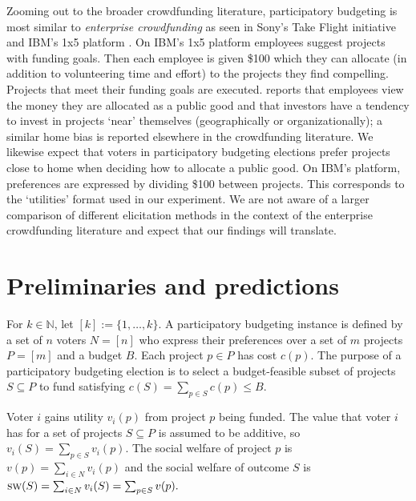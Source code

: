 \documentclass[mnsc,blindrev]{informs3_freeuse} %
\newcommand{\kibitz}[2]{\ifnum\Comments=1{\color{#1}{#2}}\fi}
\newcommand{\gb}[1]{\kibitz{red}{[GB:#1]}}
\newcommand{\sw}{\textsc{sw}}
\newcommand{\voters}{{N}}
\begin{document}
Zooming out to the   broader crowdfunding literature, participatory budgeting is most similar to \emph{enterprise crowdfunding} as seen in Sony's Take Flight initiative and IBM's 1x5 platform \citep{muller2013crowdfunding,muller2014geographical}.
On IBM's 1x5 platform employees suggest projects with funding goals. Then each  employee is given \$100 which they can allocate (in addition to volunteering time and effort) to the projects they find compelling. %
Projects that meet their funding goals are executed. \citet{muller2014geographical} reports that employees view the money they are allocated as a public good and that investors have a tendency to invest in projects `near' themselves (geographically or organizationally); a similar home bias is reported elsewhere in the crowdfunding literature. We likewise expect that voters in participatory budgeting elections prefer projects close to home when deciding how to allocate a public good. On IBM's platform, preferences are expressed by dividing \$100 between projects. This corresponds to the `utilities' format used in our experiment. We are not aware of a larger comparison of different elicitation methods in the context of the enterprise crowdfunding literature and expect that  our findings will translate. 
 
\section{Preliminaries and predictions}\label{sec:prem}

For   $k\in \mathbb{N}$,  let $[k] := \{1,\ldots,k\}$. A participatory budgeting instance is defined by a set of $n$ voters $N=[n]$ who express their preferences over a set of $m$  projects $P=[m]$ and a budget $B$. 
Each project  $p\in P$ has cost   $c(p)$. 
The purpose  of  a participatory budgeting election  is to select a budget-feasible subset of projects $S\subseteq P$  to fund satisfying   $c(S) =  \sum_{p\in S} c(p) \leq B$. 


Voter $i$ gains utility $v_i(p)$ from project $p$ being funded. The value that  voter $i$ has for a set of projects $S\subseteq P$ is assumed to be additive, so $v_i(S) = \sum_{p\in S} v_i(p)$.
The social welfare of project $p$ is $ v(p) = \sum_{i \in \voters} v_i(p)$ and the social welfare of outcome $S$ is $\sw(S) = \sum_{i\in \voters} v_i(S) = \sum_{p \in S} v(p).$ 
\end{document}
